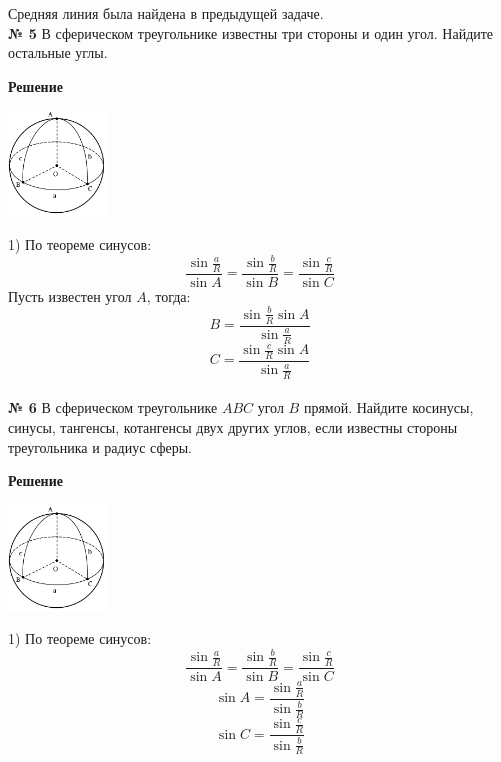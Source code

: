     Средняя линия была найдена в предыдущей задаче.\\


    \textbf{№ 5}
    В сферическом треугольнике известны три стороны и один угол.
    Найдите остальные углы.

    \textbf{Решение}\\

    \begin{center}
        \includegraphics[width=0.2\textwidth]{images/img7}\\
    \end{center}

    1) По теореме синусов:
    \[
        \frac{\sin\frac{a}{R}}{\sin A} = \frac{\sin\frac{b}{R}}{\sin B} = \frac{\sin\frac{c}{R}}{\sin C}
    \]
    Пусть известен угол $A$, тогда:
    \[
        B = \frac{\sin \frac{b}{R}\sin A}{\sin\frac{a}{R}}
    \]
    \[
        C = \frac{\sin\frac{c}{R}\sin A}{\sin\frac{a}{R}}
    \]\\


    \textbf{№ 6}
    В сферическом треугольнике $ABC$ угол $B$ прямой.
    Найдите косинусы, синусы, тангенсы, котангенсы двух других углов,
    если известны стороны треугольника и радиус сферы.

    \textbf{Решение}\\

    \begin{center}
        \includegraphics[width=0.2\textwidth]{images/img8}\\
    \end{center}

    1) По теореме синусов:
    \[
        \frac{\sin\frac{a}{R}}{\sin A} = \frac{\sin\frac{b}{R}}{\sin B} = \frac{\sin\frac{c}{R}}{\sin C}
    \]
    \[
        \sin A = \frac{\sin\frac{a}{R}}{\sin\frac{b}{R}}
    \]
    \[
        \sin C = \frac{\sin\frac{c}{R}}{\sin\frac{b}{R}}
    \]

